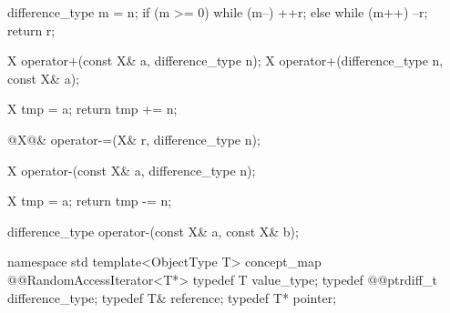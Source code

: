 \documentclass[american,twoside]{book}
\begin{document}
\pnum
{}
\begin{codeblock}
{ difference_type m = n;
  if (m >= 0) while (m--) ++r;
  else while (m++) --r;
  return r; }
\end{codeblock}

\begin{itemdecl}
X operator+(const X& a, difference_type n);
X operator+(difference_type n, const X& a);
\end{itemdecl}

\pnum
{}
\begin{codeblock}
{ X tmp = a;
return tmp += n; }
\end{codeblock}

\pnum
{}

\begin{itemdecl}
@\textcolor{addclr}{X}@& operator-=(X& r, difference_type n);
\end{itemdecl}

\pnum
{}

\begin{itemdecl}
X operator-(const X& a, difference_type n);
\end{itemdecl}

\pnum
{}
\begin{codeblock}
{ X tmp = a;
  return tmp -= n; }
\end{codeblock}

\begin{itemdecl}
difference_type operator-(const X& a, const X& b);
\end{itemdecl}

\pnum
{}

\pnum
{}

\pnum
{}

\pnum
{} 

\begin{codeblock}
namespace std {
  template<ObjectType T> concept_map @@RandomAccessIterator<T*> {
    typedef T value_type;
    typedef @@ptrdiff_t difference_type;
    typedef T& reference;
    typedef T* pointer;
  }
}
\end{codeblock}
\end{document}
